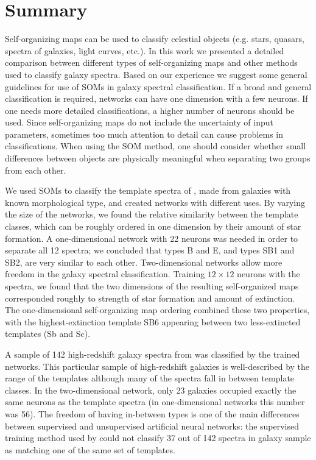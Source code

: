 \section{Summary}
\label{sec: summary_SOMZ}

    Self-organizing maps can be used to classify celestial objects (e.g. stars, quasars, spectra of galaxies, light curves, etc.).
    In this work we presented a detailed comparison between different types of self-organizing maps and other methods used to classify galaxy spectra.
    Based on our experience we suggest some general guidelines for use of SOMs in galaxy spectral classification.
    If a broad and general classification is required, networks can have one dimension with a few neurons. 
    If one needs more detailed classifications, a higher number of neurons should be used.
    Since self-organizing maps do not include the uncertainty of input parameters, sometimes too much attention to detail can cause problems in classifications. 
    When using the SOM method, one should consider whether small differences between objects are physically meaningful when separating two groups from each other.

    We used SOMs to classify the template spectra of , made from galaxies with known morphological type, and created networks with different uses.
    By varying the size of the networks, we found the relative similarity between the  template classes, which can be roughly ordered in one dimension by their amount of star formation.
     A one-dimensional network with 22 neurons was needed in order to
    separate all 12  spectra; we concluded that  types B and E, and types SB1 and SB2, are very similar to each other.
    Two-dimensional networks allow more freedom in the galaxy spectral classification.
    Training $12\times 12$ neurons with the  spectra, we found that the two dimensions of the resulting self-organized maps corresponded roughly to strength of star formation and amount of extinction. The one-dimensional self-organizing map ordering combined these two properties, with the highest-extinction template SB6 appearing between two less-extincted templates (Sb and Sc).
    
    A sample of 142 high-redshift galaxy spectra from  was classified by the trained networks.
  This particular sample of high-redshift galaxies is well-described by the range of the  templates although many of the spectra fall in between template classes.
     In the two-dimensional network, only 23 galaxies occupied exactly the same neurons as the  template spectra (in one-dimensional networks this number was 56).
    The freedom of having in-between types is one of the main differences between supervised and unsupervised artificial neural networks: the supervised training method used by  could not classify 37 out of 142 spectra in galaxy sample as matching one of the same set of templates.
    
